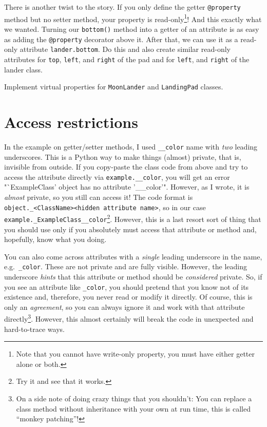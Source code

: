 \documentclass[
]{book}
\begin{document}
There is another twist to the story. If you only define the getter \texttt{@property} method but no setter method, your property is read-only\footnote{Note that you cannot have write-only property, you must have either getter alone or both.}! And this exactly what we wanted. Turning our \texttt{bottom()} method into a getter of an attribute is as easy as adding the \texttt{@property} decorator above it. After that, we can use it as a read-only attribute \texttt{lander.bottom}. Do this and also create similar read-only attributes for \texttt{top}, \texttt{left}, and \texttt{right} of the pad and for \texttt{left}, and \texttt{right} of the lander class.

Implement virtual properties for \texttt{MoonLander} and \texttt{LandingPad} classes.

\hypertarget{access-restrictions}{%
\section{Access restrictions}\label{access-restrictions}}

In the example on getter/setter methods, I used \texttt{\_\_color} name with \emph{two} leading underscores. This is a Python way to make things (almost) private, that is, invisible from outside. If you copy-paste the class code from above and try to access the attribute directly via \texttt{example.\_\_color}, you will get an error "`ExampleClass' object has no attribute '\_\_color'". However, as I wrote, it is \emph{almost} private, so you still can access it! The code format is \texttt{object.\_\textless{}ClassName\textgreater{}\textless{}hidden\ attribute\ name\textgreater{}}, so in our case \texttt{example.\_ExampleClass\_\_color}\footnote{Try it and see that it works.}. However, this is a last resort sort of thing that you should use only if you absolutely must access that attribute or method and, hopefully, know what you doing.

You can also come across attributes with a \emph{single} leading underscore in the name, e.g.~\texttt{\_color}. These are not private and are fully visible. However, the leading underscore \emph{hints} that this attribute or method should be \emph{considered} private. So, if you see an attribute like \texttt{\_color}, you should pretend that you know not of its existence and, therefore, you never read or modify it directly. Of course, this is only an \emph{agreement}, so you can always ignore it and work with that attribute directly\footnote{On a side note of doing crazy things that you shouldn't: You can replace a class method without inheritance with your own at run time, this is called ``monkey patching''!}. However, this almost certainly will break the code in unexpected and hard-to-trace ways.
\end{document}
